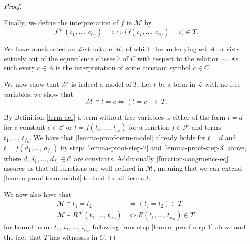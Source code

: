 \documentclass[../../main.tex]{subfiles}
\begin{document}
\begin{proof}
\begin{enumerate}
        Finally, we define the interpretation of $f$ in $\mathcal{M}$ by 
        $$f^\mathcal{M}(\tilde{c}_1,\ldots,\,\tilde{c}_{n_f}) = \tilde{c} \iff \big(f(c_1,\ldots,\,c_{n_f}) = c\big) \in T.$$
    \end{enumerate}
    We have constructed an $\mathcal{L}$-structure $\mathcal{M}$,
    of which the underlying set $A$ consists entirely out of the equivalence classes $\tilde{c}$ of $C$ with respect to the relation $\sim$.
    As such every $\tilde{c} \in A$ is the interpretation of some constant symbol $c \in C$.

    We now show that $\mathcal{M}$ is indeed a model of $T$.
    Let $t$ be a term in $\mathcal{L}$ with no free variables, 
    we show that 
    \begin{equation}\label{lemma-proof-term-model}
        \mathcal{M} \models t = c \iff (t = c) \in T.
    \end{equation}

    By Definition \ref{term-def} a term without free variables is either of the form $t = d$ for a constant $d \in \mathcal{C}$ or $t = f(t_1,\ldots,\, t_{f_n})$ for a function $f \in \mathcal{F}$ and terms $t_1,\ldots,\, t_{f_n}$.
    We have that \eqref{lemma-proof-term-model} already holds for $t = d$ and $t = f(d_1,\ldots,\, d_{f_n})$ by steps \ref{lemma-proof-step-2} and \ref{lemma-proof-step-3} above,
    where $d,\, d_1,\ldots,\, d_{f_n} \in \mathcal{C}$ are constants.
    Additionally \eqref{function-congruence-eq} assures us that all functions are well defined in $\mathcal{M}$, 
    meaning that we can extend \eqref{lemma-proof-term-model} to hold for all terms $t$.

    We now also have that
    \begin{align}
        \mathcal{M} \models t_1 = t_2  &\iff (t_1 = t_2) \in T, \label{lemma-proof-term-eqality}\\
        \mathcal{M} \models R^\mathcal{M}\left(t_1,\ldots,\,t_{n_R}\right) &\iff R(t_1,\ldots,\,t_{n_R}) \in T \ \label{lemma-proof-term-relation}
    \end{align}
    for bound terms $t_1,\, t_2, \ldots,\, t_{n_R}$ following from step \ref{lemma-proof-step-1} above and the fact that $T$ has witnesses in $C$.


\end{proof}
\end{document}
